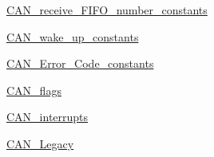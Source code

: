 \begin{DoxyCompactItemize}
\item 
\hyperlink{group__CAN__receive__FIFO__number__constants}{CAN\_\-receive\_\-FIFO\_\-number\_\-constants}
\item 
\hyperlink{group__CAN__wake__up__constants}{CAN\_\-wake\_\-up\_\-constants}
\item 
\hyperlink{group__CAN__Error__Code__constants}{CAN\_\-Error\_\-Code\_\-constants}
\item 
\hyperlink{group__CAN__flags}{CAN\_\-flags}
\item 
\hyperlink{group__CAN__interrupts}{CAN\_\-interrupts}
\item 
\hyperlink{group__CAN__Legacy}{CAN\_\-Legacy}
\end{DoxyCompactItemize}
